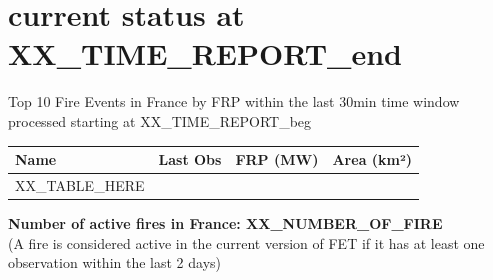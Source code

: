 \documentclass{article}
\begin{document}
\vspace*{-1.5cm} %
\noindent
{}
\vspace{1cm} %

\section{current status at XX_TIME_REPORT_end}
Top 10 Fire Events in France by FRP within the last 30min time window processed starting at XX_TIME_REPORT_beg
\begin{table}[H]
\centering
\begin{tabular}{llcc}
\toprule
\textbf{Name} & \textbf{Last Obs} & \textbf{FRP (MW)} & \textbf{Area (km²)} \\
\midrule
XX_TABLE_HERE
\bottomrule
\end{tabular}
\end{table}
\textbf{Number of active fires in France: XX_NUMBER_OF_FIRE } \\
(A fire is considered active in the current version of FET if it has at least one observation within the last 2 days)
\end{document}
